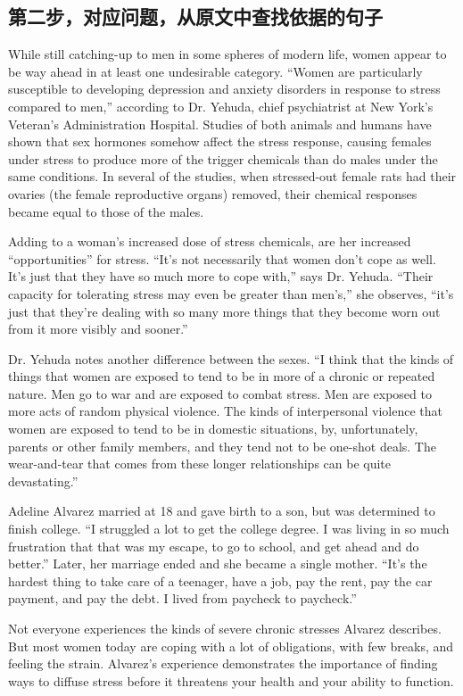 \documentclass[a4paper]{ctexart}
\begin{document}
\subsection{第二步，对应问题，从原文中查找依据的句子}

While still catching-up to men in some spheres of modern life, women appear to be way ahead in at least one undesirable category. “Women are particularly susceptible to developing depression and anxiety disorders in response to stress compared to men,” according to Dr. Yehuda, chief psychiatrist at New York’s Veteran’s Administration Hospital.
Studies of both animals and humans have shown that sex hormones somehow affect the stress response, causing females under stress to produce more of the trigger chemicals than do males under the same conditions. In several of the studies, when stressed-out female rats had their ovaries (the female reproductive organs) removed, their chemical responses became equal to those of the males.
\par
Adding to a woman’s increased dose of stress chemicals, are her increased “opportunities” for stress. “It’s not necessarily that women don’t cope as well. It’s just that they have so much more to cope with,” says Dr. Yehuda. “Their capacity for tolerating stress may even be greater than men’s,” she observes, “it’s just that they’re dealing with so many more things that they become worn out from it more visibly and sooner.”
\par
Dr. Yehuda notes another difference between the sexes. “I think that the kinds of things that women are exposed to tend to be in more of a chronic or repeated nature. Men go to war and are exposed to combat stress. Men are exposed to more acts of random physical violence. The kinds of interpersonal violence that women are exposed to tend to be in domestic situations, by, unfortunately, parents or other family members, and they tend not to be one-shot deals. The wear-and-tear that comes from these longer relationships can be quite devastating.”
\par
Adeline Alvarez married at 18 and gave birth to a son, but was determined to finish college. “I struggled a lot to get the college degree. I was living in so much frustration that that was my escape, to go to school, and get ahead and do better.” Later, her marriage ended and she became a single mother. “It’s the hardest thing to take care of a teenager, have a job, pay the rent, pay the car payment, and pay the debt. I lived from paycheck to paycheck.”
\par
Not everyone experiences the kinds of severe chronic stresses Alvarez describes. But most women today are coping with a lot of obligations, with few breaks, and feeling the strain. Alvarez’s experience demonstrates the importance of finding ways to diffuse stress before it threatens your health and your ability to function.
\\
\end{document}
